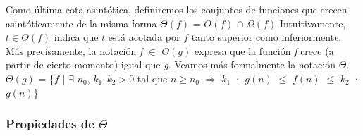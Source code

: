 \documentclass[10pt,a4paper]{article}
\begin{document}
Como última cota asintótica, definiremos los conjuntos de funciones que crecen asintóticamente de la misma forma
\newline
\newline
$\Theta(f)$ = $O(f)$ $\cap$ $\Omega(f)$
\newline
\newline
Intuitivamente, $t \in \Theta(f)$ indica que $t$ está acotada por $f$ tanto superior como inferiormente. 
\newline
\newline
Más precisamente, la notación \textit{f $\in$ $\Theta(g)$} expresa que la función \textit{f} crece (a partir de cierto momento) igual que \textit{g}.
\newline
\newline
Veamos más formalmente la notación $\Theta$.
\newline
\newline
$\Theta(g)$ = \{$f$ $|$ $\exists$ $n_{0}$, $k_{1},k_{2} > 0$ tal que $n \geq n_{0}$ $\Rightarrow$ $k_{1}$ · $g(n)$ $\leq$ $f(n)$ $\leq$ $k_{2}$ · $g(n)$\} 

\subsubsection{Propiedades de $\Theta$}
\end{document}
